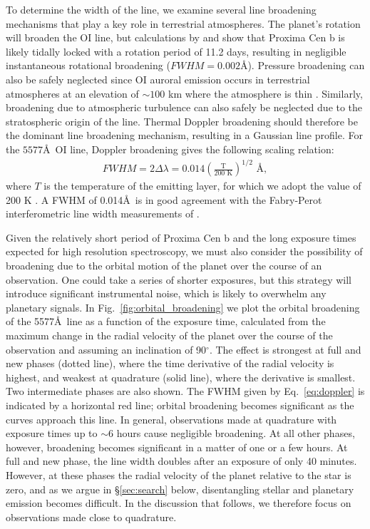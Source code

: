 \documentclass{emulateapj}
\begin{document}
To determine the width of the line, we examine several line broadening mechanisms that play a key role in terrestrial atmospheres.   The planet's rotation will broaden the OI line, but calculations by \citet{Barnes2016} and \citet{Ribas2016} show that Proxima Cen b is likely tidally locked with a rotation period of 11.2 days, resulting in negligible instantaneous rotational broadening ($FWHM = 0.002$\AA).  Pressure broadening can also be safely neglected since OI auroral emission occurs in terrestrial atmospheres at an elevation of ${\sim}100$ km where the atmosphere is thin \citep{Slanger2001}. Similarly, broadening due to atmospheric turbulence can also safely be neglected due to the stratospheric origin of the line. Thermal Doppler broadening should therefore be the dominant line broadening mechanism, resulting in a Gaussian line profile. For the $5577$\AA\ OI line, Doppler broadening gives the following scaling relation:
%
\begin{align}
    FWHM = 2\Delta \lambda = 0.014 \left ( \frac{\text{T}}{200 \text{ K}} \right )^{1/2} \text{ \AA}, \label{eq:doppler}
\end{align}
%
where $T$ is the temperature of the emitting layer, for which we adopt the value of 200 K \citep[c.f.][]{Slanger2001}. 
A FWHM of 0.014\AA\ is in good agreement with the Fabry-Perot interferometric line width measurements of \citet{Wark1960}.

Given the relatively short period of Proxima Cen b and the long exposure times expected for high resolution spectroscopy, we must also consider the possibility of broadening due to the orbital motion of the planet over the course of an observation. One could take a series of shorter exposures, but this strategy will introduce significant instrumental noise, which is likely to overwhelm any planetary signals. In Fig.~\ref{fig:orbital_broadening} we plot the orbital broadening of the 5577\AA\ line as a function of the exposure time, calculated from the maximum change in the radial velocity of the planet over the course of the observation and assuming an inclination of 90$^\circ$. The effect is strongest at full and new phases (dotted line), where the time derivative of the radial velocity is highest, and weakest at quadrature (solid line), where the derivative is smallest. Two intermediate phases are also shown. The FWHM given by Eq.~\ref{eq:doppler} is indicated by a horizontal red line; orbital broadening becomes significant as the curves approach this line. In general, observations made at quadrature with exposure times up to ${\sim} 6$ hours cause negligible broadening. At all other phases, however, broadening becomes significant in a matter of one or a few hours. At full and new phase, the line width doubles after an exposure of only 40 minutes. However, at these phases the radial velocity of the planet relative to the star is zero, and as we argue in \S\ref{sec:search} below, disentangling stellar and planetary emission becomes difficult. In the discussion that follows, we therefore focus on observations made close to quadrature.
\end{document}
